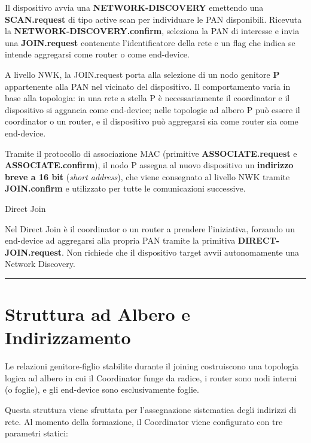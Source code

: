 \documentclass[
  italian,
  openany]{book}
\begin{document}
Il dispositivo avvia una \textbf{NETWORK-DISCOVERY} emettendo una
\textbf{SCAN.request} di tipo active scan per individuare le PAN
disponibili. Ricevuta la \textbf{NETWORK-DISCOVERY.confirm}, seleziona
la PAN di interesse e invia una \textbf{JOIN.request} contenente
l'identificatore della rete e un flag che indica se intende aggregarsi
come router o come end-device.

A livello NWK, la JOIN.request porta alla selezione di un nodo genitore
\textbf{P} appartenente alla PAN nel vicinato del dispositivo. Il
comportamento varia in base alla topologia: in una rete a stella P è
necessariamente il coordinator e il dispositivo si aggancia come
end-device; nelle topologie ad albero P può essere il coordinator o un
router, e il dispositivo può aggregarsi sia come router sia come
end-device.

Tramite il protocollo di associazione MAC (primitive
\textbf{ASSOCIATE.request} e \textbf{ASSOCIATE.confirm}), il nodo P
assegna al nuovo dispositivo un \textbf{indirizzo breve a 16 bit}
(\emph{short address}), che viene consegnato al livello NWK tramite
\textbf{JOIN.confirm} e utilizzato per tutte le comunicazioni
successive.

\begin{calloutnote}{Direct Join}

Nel Direct Join è il coordinator o un router a prendere l'iniziativa,
forzando un end-device ad aggregarsi alla propria PAN tramite la
primitiva \textbf{DIRECT-JOIN.request}. Non richiede che il dispositivo
target avvii autonomamente una Network Discovery.

\end{calloutnote}

\begin{center}\rule{0.5\linewidth}{0.5pt}\end{center}

\section{Struttura ad Albero e
Indirizzamento}\label{struttura-ad-albero-e-indirizzamento}

Le relazioni genitore-figlio stabilite durante il joining costruiscono
una topologia logica ad albero in cui il Coordinator funge da radice, i
router sono nodi interni (o foglie), e gli end-device sono
esclusivamente foglie.

Questa struttura viene sfruttata per l'assegnazione sistematica degli
indirizzi di rete. Al momento della formazione, il Coordinator viene
configurato con tre parametri statici:
\end{document}
